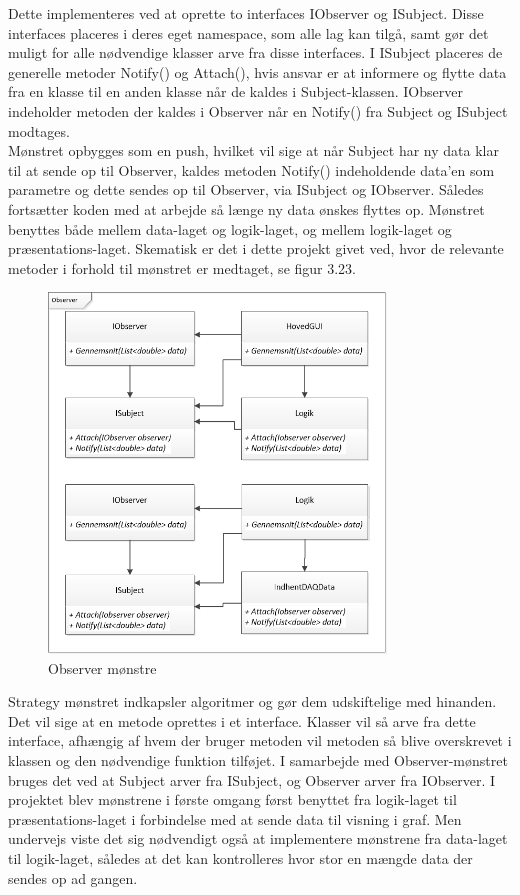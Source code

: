 Dette implementeres ved at oprette to interfaces IObserver og ISubject. Disse interfaces placeres i deres eget namespace, som alle lag kan tilgå, samt gør det muligt for alle nødvendige klasser arve fra disse interfaces. I ISubject placeres de generelle metoder Notify() og Attach(), hvis ansvar er at informere og flytte data fra en klasse til en anden klasse når de kaldes i Subject-klassen. IObserver indeholder metoden der kaldes i Observer når en Notify() fra Subject og ISubject modtages. \\
Mønstret opbygges som en push, hvilket vil sige at når Subject har ny data klar til at sende op til Observer, kaldes metoden Notify() indeholdende data’en som parametre og dette sendes op til Observer, via ISubject og IObserver. Således fortsætter koden med at arbejde så længe ny data ønskes flyttes op. Mønstret benyttes både mellem data-laget og logik-laget, og mellem logik-laget og præsentations-laget. Skematisk er det i dette projekt givet ved, hvor de relevante metoder i forhold til mønstret er medtaget, se figur 3.23.
\begin{figure}[H]
	\centering
	\includegraphics[width=0.8\textwidth]{Figurer/ObserverStrategy}
	\caption{Observer mønstre}
\end{figure}
Strategy mønstret indkapsler algoritmer og gør dem udskiftelige med hinanden. Det vil sige at en metode oprettes i et interface. Klasser vil så arve fra dette interface, afhængig af hvem der bruger metoden vil metoden så blive overskrevet i klassen og den nødvendige funktion tilføjet. I samarbejde med Observer-mønstret bruges det ved at Subject arver fra ISubject, og Observer arver fra IObserver. 
I projektet blev mønstrene i første omgang først benyttet fra logik-laget til præsentations-laget i forbindelse med at sende data til visning i graf. Men undervejs viste det sig nødvendigt også at implementere mønstrene fra data-laget til logik-laget, således at det kan kontrolleres hvor stor en mængde data der sendes op ad gangen. 

